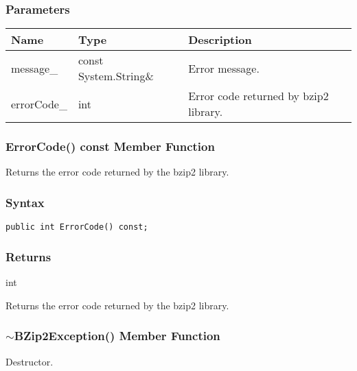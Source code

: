 \documentclass[a4paper,oneside,11.000000pt]{book}
\begin{document}
\subsubsection*{Parameters}
\begin{flushleft}
\begin{supertabular}[l]{lll}
\textbf{Name}
& \textbf{Type}
& \textbf{Description}
\\
\hline
message\_
& const System.\-String\&\-
& Error message.

\\
errorCode\_
& int
& Error code returned by bzip2 library.

\\
\end{supertabular}

\end{flushleft}
\clearpage

\hypertarget{System.IO.Compression.BZip2Exception.ErrorCode.C.P.System.IO.Compression.BZip2Exception}{\subsubsection*{ErrorCode() const Member Function}}
\begin{flushleft}
Returns the error code returned by the bzip2 library.

\end{flushleft}
\subsubsection*{Syntax}\texttt{public int ErrorCode() const;}

\subsubsection*{Returns}int
\begin{flushleft}
Returns the error code returned by the bzip2 library.

\end{flushleft}
\clearpage

\hypertarget{System.IO.Compression.BZip2Exception.destructor.P.System.IO.Compression.BZip2Exception}{\subsubsection*{$\sim$BZip2Exception() Member Function}}\begin{flushleft}
Destructor.

\end{flushleft}
\end{document}
